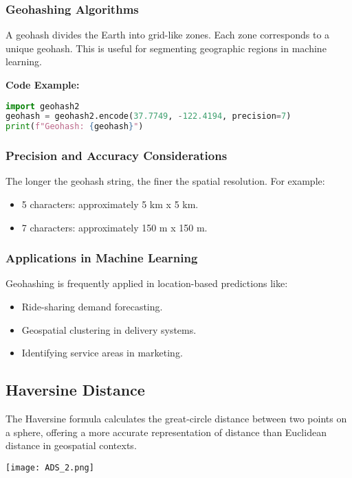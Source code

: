 \documentclass{article}
\begin{document}
\subsubsection{Geohashing Algorithms}
A geohash divides the Earth into grid-like zones. Each zone corresponds to a unique geohash. This is useful for segmenting geographic regions in machine learning.

\textbf{Code Example:}

\begin{lstlisting}[language=Python]
import geohash2
geohash = geohash2.encode(37.7749, -122.4194, precision=7)
print(f"Geohash: {geohash}")
\end{lstlisting}

\subsubsection{Precision and Accuracy Considerations}
The longer the geohash string, the finer the spatial resolution. For example:
\begin{itemize}
    \item 5 characters: approximately 5 km x 5 km.
    \item 7 characters: approximately 150 m x 150 m.
\end{itemize}

\subsubsection{Applications in Machine Learning}
Geohashing is frequently applied in location-based predictions like:
\begin{itemize}
    \item Ride-sharing demand forecasting.
    \item Geospatial clustering in delivery systems.
    \item Identifying service areas in marketing.
\end{itemize}

\subsection{Haversine Distance}
The Haversine formula calculates the great-circle distance between two points on a sphere, offering a more accurate representation of distance than Euclidean distance in geospatial contexts.


\begin{center}

\texttt{[image: ADS\_2.png]}

\end{center}
\end{document}
